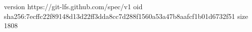 version https://git-lfs.github.com/spec/v1
oid sha256:7ecffc22f89148d13d22ff3dda8cc7d288f1560a53a47b8aafcf1b01d6732f51
size 1808
